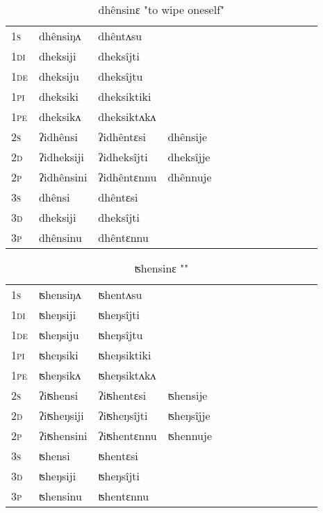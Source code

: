 \documentclass[oldfontcommands,oneside,a4paper,11pt]{article}
\begin{document}
\begin{table}[H]
\label{ek.vr} \centering 
\caption{dhênsinɛ  "to wipe oneself"  }
\begin{tabular}{l|l|l|l|l|l|l|l|l|l|l|l|l}  \toprule
\textsc{1s} &dhênsiŋʌ &dhêntʌsu \\ 
\textsc{1di} &dheksiji &dheksîjti   \\
\textsc{1de} &dheksiju &dheksîjtu   \\ 
\textsc{1pi} &dheksiki &dheksiktiki   \\ 
\textsc{1pe} &dheksikʌ &dheksiktʌkʌ   \\ 
\textsc{2s} & ʔidhênsi & ʔidhêntɛsi &dhênsije  \\ 
\textsc{2d} & ʔidheksiji & ʔidheksîjti &dheksîjje    \\
\textsc{2p} & ʔidhênsini  & ʔidhêntɛnnu &dhênnuje  \\ 
\textsc{3s} & dhênsi & dhêntɛsi   \\ 
\textsc{3d} & dheksiji & dheksîjti   \\ 
\textsc{3p} & dhênsinu  & dhêntɛnnu \\ 
\bottomrule
\end{tabular}
\end{table}


\begin{table}[H]
\label{eŋ.vr} \centering 
\caption{ʦhensinɛ  ""  }
\begin{tabular}{l|l|l|l|l|l|l|l|l|l|l|l|l}  \toprule
\textsc{1s} &ʦhensiŋʌ &ʦhentʌsu \\ 
\textsc{1di} &ʦheŋsiji &ʦheŋsîjti   \\
\textsc{1de} &ʦheŋsiju &ʦheŋsîjtu   \\ 
\textsc{1pi} &ʦheŋsiki &ʦheŋsiktiki   \\ 
\textsc{1pe} &ʦheŋsikʌ &ʦheŋsiktʌkʌ   \\ 
\textsc{2s} & ʔiʦhensi & ʔiʦhentɛsi &ʦhensije  \\ 
\textsc{2d} & ʔiʦheŋsiji & ʔiʦheŋsîjti &ʦheŋsîjje    \\
\textsc{2p} & ʔiʦhensini  & ʔiʦhentɛnnu &ʦhennuje  \\ 
\textsc{3s} & ʦhensi & ʦhentɛsi   \\ 
\textsc{3d} & ʦheŋsiji & ʦheŋsîjti   \\ 
\textsc{3p} & ʦhensinu  & ʦhentɛnnu \\ 
\bottomrule
\end{tabular}
\end{table}
\end{document}
